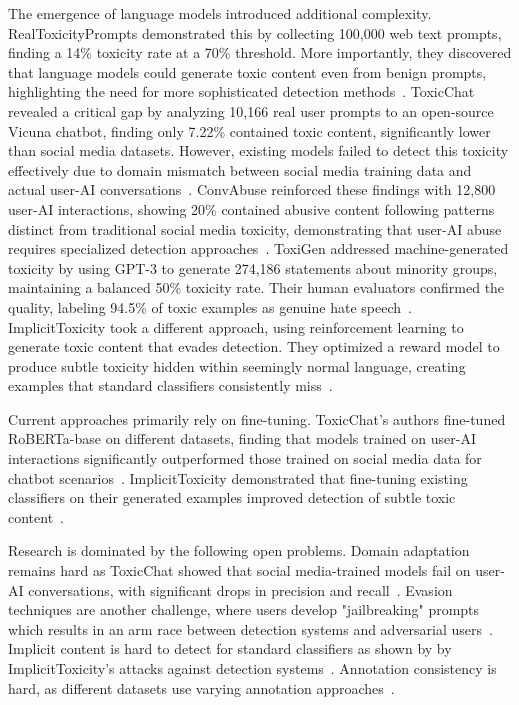 The emergence of language models introduced additional complexity. RealToxicityPrompts demonstrated this by collecting 100,000 web text prompts, finding a 14\% toxicity rate at a 70\% threshold. More importantly, they discovered that language models could generate toxic content even from benign prompts, highlighting the need for more sophisticated detection methods~\cite{rtp}. ToxicChat revealed a critical gap by analyzing 10,166 real user prompts to an open-source Vicuna chatbot, finding only 7.22\% contained toxic content, significantly lower than social media datasets. However, existing models failed to detect this toxicity effectively due to domain mismatch between social media training data and actual user-AI conversations~\cite{ToxicChat}. ConvAbuse reinforced these findings with 12,800 user-AI interactions, showing 20\% contained abusive content following patterns distinct from traditional social media toxicity, demonstrating that user-AI abuse requires specialized detection approaches~\cite{cercas-curry-etal-2021-convabuse}. ToxiGen addressed machine-generated toxicity by using GPT-3 to generate 274,186 statements about minority groups, maintaining a balanced 50\% toxicity rate. Their human evaluators confirmed the quality, labeling 94.5\% of toxic examples as genuine hate speech~\cite{hartvigsen2022toxigenlargescalemachinegenerateddataset}. ImplicitToxicity took a different approach, using reinforcement learning to generate toxic content that evades detection. They optimized a reward model to produce subtle toxicity hidden within seemingly normal language, creating examples that standard classifiers consistently miss~\cite{wen2023unveilingimplicittoxicitylarge}.

Current approaches primarily rely on fine-tuning. ToxicChat's authors fine-tuned RoBERTa-base on different datasets, finding that models trained on user-AI interactions significantly outperformed those trained on social media data for chatbot scenarios~\cite{ToxicChat}. ImplicitToxicity demonstrated that fine-tuning existing classifiers on their generated examples improved detection of subtle toxic content~\cite{wen2023unveilingimplicittoxicitylarge}.

Research is dominated by the following open problems. Domain adaptation remains hard as ToxicChat showed that social media-trained models fail on user-AI conversations, with significant drops in precision and recall~\cite{ToxicChat}. Evasion techniques are another challenge, where users develop "jailbreaking" prompts which results in an arm race between detection systems and adversarial users~\cite{hartvigsen2022toxigenlargescalemachinegenerateddataset}. Implicit content is hard to detect for standard classifiers as shown by by ImplicitToxicity's attacks against detection systems~\cite{wen2023unveilingimplicittoxicitylarge}. Annotation consistency is hard, as different datasets use varying annotation approaches~\cite{hartvigsen2022toxigenlargescalemachinegenerateddataset}.